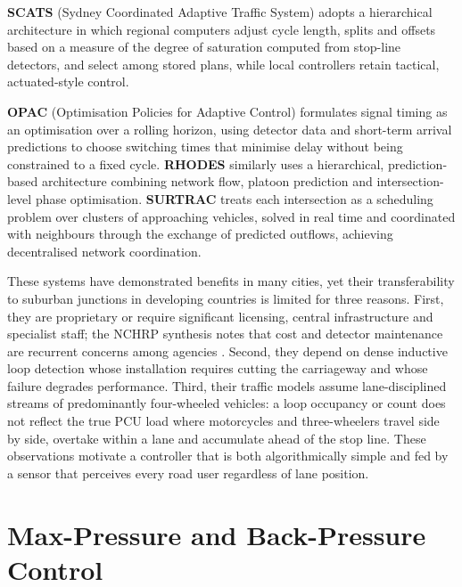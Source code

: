 \textbf{SCATS} (Sydney Coordinated Adaptive Traffic System) \cite{sims1980scats} adopts a hierarchical
architecture in which regional computers adjust cycle length, splits and offsets based on a measure of the
degree of saturation computed from stop-line detectors, and select among stored plans, while local controllers
retain tactical, actuated-style control.

\textbf{OPAC} (Optimisation Policies for Adaptive Control) \cite{gartner1983opac} formulates signal timing as an
optimisation over a rolling horizon, using detector data and short-term arrival predictions to choose switching
times that minimise delay without being constrained to a fixed cycle. \textbf{RHODES} \cite{mirchandani2001rhodes}
similarly uses a hierarchical, prediction-based architecture combining network flow, platoon prediction and
intersection-level phase optimisation. \textbf{SURTRAC} \cite{xie2012surtrac} treats each intersection as a
scheduling problem over clusters of approaching vehicles, solved in real time and coordinated with neighbours
through the exchange of predicted outflows, achieving decentralised network coordination.

These systems have demonstrated benefits in many cities, yet their transferability to suburban junctions in
developing countries is limited for three reasons. First, they are proprietary or require significant licensing,
central infrastructure and specialist staff; the NCHRP synthesis notes that cost and detector maintenance are
recurrent concerns among agencies \cite{stevanovic2010nchrp}. Second, they depend on dense inductive loop
detection whose installation requires cutting the carriageway and whose failure degrades performance. Third,
their traffic models assume lane-disciplined streams of predominantly four-wheeled vehicles: a loop occupancy
or count does not reflect the true PCU load where motorcycles and three-wheelers travel side by side, overtake
within a lane and accumulate ahead of the stop line. These observations motivate a controller that is both
algorithmically simple and fed by a sensor that perceives every road user regardless of lane position.

\section{Max-Pressure and Back-Pressure Control}\label{sec:lit-maxpressure}
